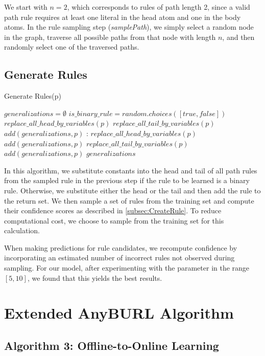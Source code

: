 We start with \(n = 2\), which corresponds to rules of path length 2, since a valid path rule requires at least one literal in the head atom and one in the body atoms. In the rule sampling step (\textit{samplePath}), we simply select a random node in the graph, traverse all possible paths from that node with length \(n\), and then randomly select one of the traversed paths.


\subsection{Generate Rules}
\label{subsec:CreateRule}

\begin{algorithm}
	\caption{Generate Rules(p)}
	\label{alg:GenerateRules}
	\begin{algorithmic}[1]
		\State $\textit{generalizations} = \emptyset$
		\State $is\_binary\_rule = random.choices([true,false])$
		\State $replace\_all\_head\_by\_variables(p)$
		\State $replace\_all\_tail\_by\_variables(p)$
		\State $add(generalizations, p)$
		\Else:
		\State $replace\_all\_head\_by\_variables(p)$
		\State $add(generalizations, p)$
		\State $replace\_all\_tail\_by\_variables(p)$
		\State $add(generalizations, p)$
		\EndIf
		\Return $generalizations$
		\EndProcedure
	\end{algorithmic}
\end{algorithm}

In this algorithm, we substitute constants into the head and tail of all path rules from the sampled rule in the previous step if the rule to be learned is a binary rule. Otherwise, we substitute either the head or the tail and then add the rule to the return set. We then sample a set of rules from the training set and compute their confidence scores as described in \autoref{subsec:CreateRule}. To reduce computational cost, we choose to sample from the training set for this calculation. 

When making predictions for rule candidates, we recompute confidence by incorporating an estimated number of incorrect rules not observed during sampling. For our model, after experimenting with the parameter in the range \([5, 10]\), we found that this yields the best results.

\section{Extended AnyBURL Algorithm}
\subsection{Algorithm 3: Offline-to-Online Learning}


